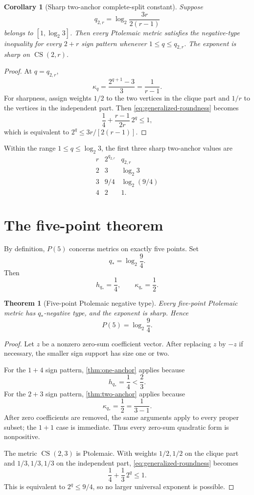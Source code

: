 \documentclass[11pt]{amsart}
\newtheorem{theorem}{Theorem}[section]
\newtheorem{corollary}[corollary]{Corollary}
\theoremstyle{definition}
\theoremstyle{remark}
\newcommand{\CS}{\operatorname{CS}}
\newcommand{\qstar}{q_*}
\begin{document}
\begin{corollary}[Sharp two-anchor complete-split constant]\label{cor:split-two}
Suppose
\[
 q_{2,r}=\log_2\frac{3r}{2(r-1)}
\]
belongs to $[1,\log_2 3]$. Then every Ptolemaic metric satisfies the negative-type inequality for every $2+r$ sign pattern whenever $1\le q\le q_{2,r}$. The exponent is sharp on $\CS(2,r)$.
\end{corollary}

\begin{proof}
At $q=q_{2,r}$,
\[
 \kappa_q=\frac{2^{q+1}-3}{3}=\frac1{r-1}.
\]
For sharpness, assign weights $1/2$ to the two vertices in the clique part and $1/r$ to the vertices in the independent part. Then \eqref{eq:generalized-roundness} becomes
\[
 \frac14+\frac{r-1}{2r}\,2^q\le1,
\]
which is equivalent to $2^q\le3r/[2(r-1)]$.
\end{proof}

Within the range $1\le q\le\log_2 3$, the first three sharp two-anchor values are
\[
\begin{array}{c|c|c}
 r&2^{q_{2,r}}&q_{2,r}\\ \hline
 2&3&\log_2 3\\
 3&9/4&\log_2(9/4)\\
 4&2&1.
\end{array}
\]

\section{The five-point theorem}

By definition, $P(5)$ concerns metrics on exactly five points. Set
\[
 \qstar=\log_2\frac94.
\]
Then
\[
 h_{\qstar}=\frac14,
 \qquad
 \kappa_{\qstar}=\frac12.
\]

\begin{theorem}[Five-point Ptolemaic negative type]\label{thm:five-point}
Every five-point Ptolemaic metric has $\qstar$-negative type, and the exponent is sharp. Hence
\[
 \boxed{P(5)=\log_2\frac94.}
\]
\end{theorem}

\begin{proof}
Let $z$ be a nonzero zero-sum coefficient vector. After replacing $z$ by $-z$ if necessary, the smaller sign support has size one or two.

For the $1+4$ sign pattern, \cref{thm:one-anchor} applies because
\[
 h_{\qstar}=\frac14<\frac23.
\]
For the $2+3$ sign pattern, \cref{thm:two-anchor} applies because
\[
 \kappa_{\qstar}=\frac12=\frac1{3-1}.
\]
After zero coefficients are removed, the same arguments apply to every proper subset; the $1+1$ case is immediate. Thus every zero-sum quadratic form is nonpositive.

The metric $\CS(2,3)$ is Ptolemaic. With weights $1/2,1/2$ on the clique part and $1/3,1/3,1/3$ on the independent part, \eqref{eq:generalized-roundness} becomes
\[
 \frac14+\frac13\,2^q\le1.
\]
This is equivalent to $2^q\le9/4$, so no larger universal exponent is possible.
\end{proof}
\end{document}
